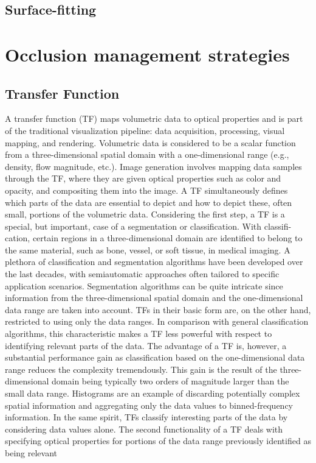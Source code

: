 \subsection{Surface-fitting}


\section{Occlusion management strategies}



\subsection{Transfer Function}

A transfer function (TF) maps volumetric data to optical properties
and is part of the traditional visualization pipeline: data acquisition,
processing, visual mapping, and rendering. Volumetric data is
considered to be a scalar function from a three-dimensional spatial
domain with a one-dimensional range (e.g., density, flow magnitude,
etc.). Image generation involves mapping data samples through the
TF, where they are given optical properties such as color and opacity,
and compositing them into the image.
A TF simultaneously defines which parts of the data are essential
to depict and  how to depict these, often small, portions
of the volumetric data. Considering the first step, a TF is a special,
but important, case of a segmentation or classification. With classifi-
cation, certain regions in a three-dimensional domain are identified
to belong to the same material, such as bone, vessel, or soft tissue,
in medical imaging. A plethora of classification and segmentation
algorithms have been developed over the last decades, with semiautomatic
approaches often tailored to specific application scenarios.
Segmentation algorithms can be quite intricate since information
from the three-dimensional spatial domain and the one-dimensional
data range are taken into account. TFs in their basic form are, on the
other hand, restricted to using only the data ranges. In comparison
with general classification algorithms, this characteristic makes a
TF less powerful with respect to identifying relevant parts of the
data. The advantage of a TF is, however, a substantial performance
gain as classification based on the one-dimensional data range reduces
the complexity tremendously. This gain is the result of the
three-dimensional domain being typically two orders of magnitude
larger than the small data range. Histograms are an example of discarding
potentially complex spatial information and aggregating
only the data values to binned-frequency information. In the same
spirit, TFs classify interesting parts of the data by considering data
values alone. The second functionality of a TF deals with specifying
optical properties for portions of the data range previously identified
as being relevant

